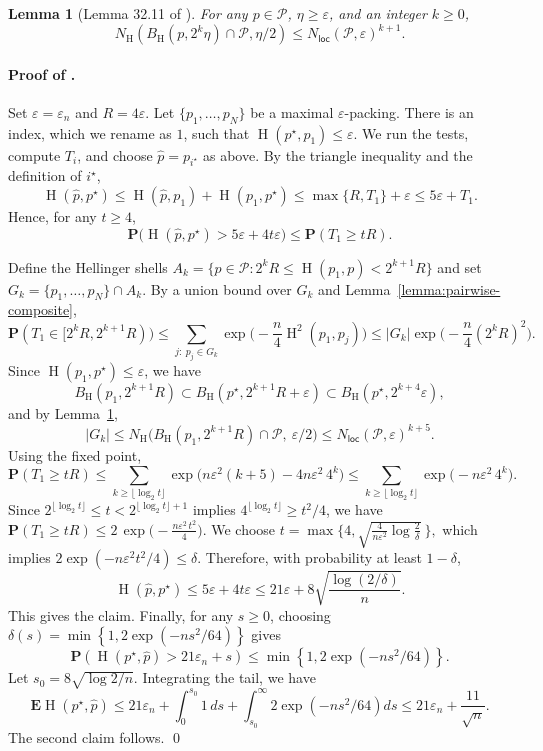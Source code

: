 \documentclass[11pt]{article}
\newcommand{\E}{{\mathbf E}}
\renewcommand{\P}{\mathbf P}
\renewcommand{\le}{\leqslant}
\renewcommand{\ge}{\geqslant}
\newcommand{\eps}{\varepsilon}
\newcommand{\nloc}{N_{\mathsf{loc}}}
\renewcommand{\hat}{\widehat}
\newcommand{\hel}{\operatorname{H}}
\newcommand{\hels}{\hel^2}
\newtheorem{lemma}{Lemma}
\theoremstyle{definition}
\theoremstyle{remark}
\begin{document}
\begin{lemma}[Lemma 32.11 of \cite{polyanskiy2025information}]\label{lemma:local-net}
        For any $p \in \mathcal{P}$, $\eta \ge \eps$, and an integer $k \ge 0$,
        \begin{equation*}
            N_{\hel}(B_{\hel}(p,2^k \eta) \cap \mathcal{P}, \eta/2) \le \nloc(\mathcal{P},\eps)^{k+1}.
        \end{equation*}
\end{lemma}
\paragraph{Proof of .}
Set $\eps=\eps_n$ and $R=4\eps$. Let $\{p_1,\ldots,p_N\}$ be a maximal $\eps$-packing. There is an index, which we rename as $1$, such that $\hel(p^\star,p_1)\le \eps$. We run the tests, compute $T_i$, and choose $\widehat{p}=p_{i^\star}$ as above. By the triangle inequality and the definition of $i^\star$,
\[
\hel(\widehat{p},p^\star)\le \hel(\widehat{p},p_1)+\hel(p_1,p^\star)\le \max\{R,T_1\}+\eps\le 5\eps+T_1.
\]
Hence, for any $t\ge 4$,
\[
\P\big(\hel(\widehat{p},p^\star)>5\eps+4t\eps\big)\le \P(T_1\ge tR).
\]

Define the Hellinger shells $A_k=\{p\in\mathcal{P}: 2^kR\le \hel(p_1,p)<2^{k+1}R\}$ and set $G_k=\{p_1,\ldots,p_N\}\cap A_k$. By a union bound over $G_k$ and Lemma~\ref{lemma:pairwise-composite},
\[
\P(T_1\in[2^kR,2^{k+1}R))
\le \sum_{j:\ p_j\in G_k}\exp\Big(-\frac{n}{4}\hels(p_1,p_j)\Big)
\le |G_k|\exp\Big(-\frac{n}{4}(2^kR)^2\Big).
\]
Since $\hel(p_1,p^\star)\le \eps$, we have
\[
B_{\hel}(p_1,2^{k+1}R)\subset B_{\hel}(p^\star,2^{k+1}R+\eps)\subset B_{\hel}(p^\star,2^{k+4}\eps),
\]
and by Lemma~\ref{lemma:local-net},
\[
|G_k|\le N_{\hel}\big(B_{\hel}(p_1,2^{k+1}R)\cap\mathcal{P},\ \eps/2\big)\le \nloc(\mathcal{P},\eps)^{k+5}.
\]
Using the fixed point,
\[
\P(T_1\ge tR)\le \sum_{k\ge \lfloor\log_2 t\rfloor}\exp\big(n\eps^2(k+5)-4n\eps^2\,4^k\big)\le \sum_{k\ge \lfloor\log_2 t\rfloor}\exp\big(-n\eps^2\,4^k\big).
\]
Since $2^{\lfloor\log_2 t\rfloor}\le t<2^{\lfloor\log_2 t\rfloor+1}$ implies $4^{\lfloor\log_2 t\rfloor}\ge t^2/4$, we have
$
\P(T_1\ge tR)\le 2\,\exp\Big(-\frac{n\eps^2\,t^2}{4}\Big).
$
We choose
$
t=\max\Big\{4,\sqrt{ \frac{4}{n\eps^2}\log\frac{2}{\delta}}\ \Big\},
$
which implies $2\exp(-n\eps^2 t^2/4)\le \delta$. Therefore, with probability at least $1-\delta$,
\[
\hel(\widehat{p},p^\star)\le 5\eps+4t\eps\le 21\eps+8\sqrt{\frac{\log(2/\delta)}{n}}.
\]
This gives the claim. Finally, for any $s\ge 0$, choosing $\delta(s)=\min\left\{1, 2 \exp(-n s^{2}/64)\right\}$ gives
\[
\P\left(\hel(p^\star,\hat p) > 21\eps_n + s\right)\le \min\left\{1, 2 \exp(-n s^{2}/64)\right\}.
\]
Let $s_0=8\sqrt{\log 2 / n}$. Integrating the tail, we have
\[
\E\hel(p^\star,\widehat{p})
\le 21\eps_n + \int_{0}^{s_0} 1\,ds + \int_{s_0}^{\infty} 2 \exp(-n s^{2}/64)ds
\le 21\eps_n + \frac{11}{\sqrt{n}}.
\]
The second claim follows. \qed
\end{document}
